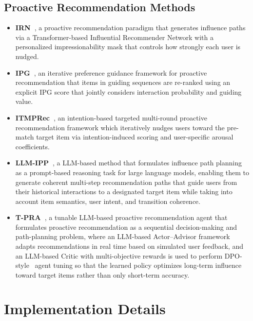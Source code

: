 \documentclass{llmxive}
\begin{document}
\subsection{Proactive Recommendation Methods}

\begin{itemize}
    \item \textbf{IRN~\cite{zhu2023influential}}, a proactive recommendation paradigm that generates influence paths via a Transformer-based Influential Recommender Network with a personalized impressionability mask that controls how strongly each user is nudged.
    \item \textbf{IPG~\cite{bi2024proactive}}, an iterative preference guidance framework for proactive recommendation that items in guiding sequences are re-ranked using an explicit IPG score that jointly considers interaction probability and guiding value.
    \item \textbf{ITMPRec~\cite{lian2025itmprec}}, an intention-based targeted multi-round proactive recommendation framework which iteratively nudges users toward the pre-match target item via intention-induced scoring and user-specific arousal coefficients.
    \item \textbf{LLM-IPP~\cite{wang2025leveraging}}, a LLM-based method that formulates influence path planning as a prompt-based reasoning task for large language models, enabling them to generate coherent multi-step recommendation paths that guide users from their historical interactions to a designated target item while taking into account item semantics, user intent, and transition coherence.
    \item \textbf{T-PRA~\cite{wang2025tunable}}, a tunable LLM-based proactive recommendation agent that formulates proactive recommendation as a sequential decision-making and path-planning problem, where an LLM-based Actor–Advisor framework~\cite{kahneman2011thinking} adapts recommendations in real time based on simulated user feedback, and an LLM-based Critic with multi-objective rewards is used to perform DPO-style~\cite{rafailov2023direct} agent tuning so that the learned policy optimizes long-term influence toward target items rather than only short-term accuracy.
\end{itemize}

\section{Implementation Details}
\label{app:implementation}
\end{document}
